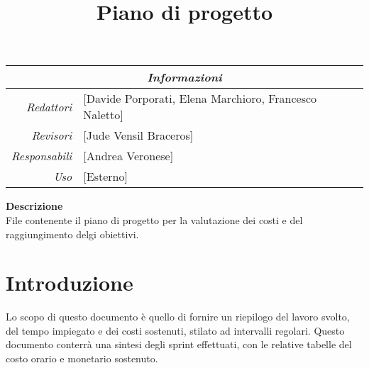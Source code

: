 \documentclass[12pt]{article}
\begin{document}
\graphicspath{ {../templates/img/} }
\setcounter{tocdepth}{4}
\setcounter{secnumdepth}{4}
\title{Piano di progetto}

\firstPage

\pagestyle{genericDocstyle}
\maketitle

\begin{center}
    \begin{tabular}{r | l}
		\multicolumn{2}{c}{\textit{Informazioni}}\\
		\hline
		
			\textit{Redattori} &
			[Davide Porporati, Elena Marchioro, Francesco Naletto]\makecell{}\\

			\textit{Revisori} &
			[Jude Vensil Braceros]\makecell{}\\
			\textit{Responsabili} &
			[Andrea Veronese]\makecell{}\\
		      \textit{Uso} & 
                [Esterno]\makecell{}\\
    \end{tabular}
\end{center}

\begin{center}
    \textbf{Descrizione}\\
    File contenente il piano di progetto per la valutazione dei costi e del raggiungimento delgi obiettivi.
\end{center}

\pagebreak

\tableofcontents
\pagebreak

\printindex 
\pagebreak



\makeversioni

\section{Introduzione}
Lo scopo di questo documento è quello di fornire un riepilogo del lavoro svolto, del tempo impiegato e dei costi sostenuti, stilato ad intervalli regolari.
Questo documento conterrà una sintesi degli sprint effettuati, con le relative tabelle del costo orario e monetario sostenuto.
\end{document}

